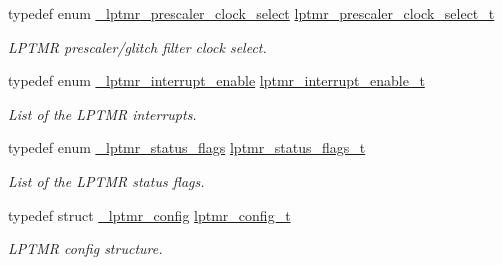 \begin{DoxyCompactItemize}
typedef enum \mbox{\hyperlink{group__lptmr_ga68d8b01f0167f938bfa86442f4772ced}{\+\_\+lptmr\+\_\+prescaler\+\_\+clock\+\_\+select}} \mbox{\hyperlink{group__lptmr_ga63bfd703c032aeb0820e8131c4720cb8}{lptmr\+\_\+prescaler\+\_\+clock\+\_\+select\+\_\+t}}
\begin{DoxyCompactList}\small\item\em L\+P\+T\+MR prescaler/glitch filter clock select. \end{DoxyCompactList}\item 
\mbox{\label{group__lptmr_gaeb8b682e5e92adfff936a174dc93a128}} 
typedef enum \mbox{\hyperlink{group__lptmr_gade9e5cb91c7534d9b9ac51909edae02e}{\+\_\+lptmr\+\_\+interrupt\+\_\+enable}} \mbox{\hyperlink{group__lptmr_gaeb8b682e5e92adfff936a174dc93a128}{lptmr\+\_\+interrupt\+\_\+enable\+\_\+t}}
\begin{DoxyCompactList}\small\item\em List of the L\+P\+T\+MR interrupts. \end{DoxyCompactList}\item 
\mbox{\label{group__lptmr_gad3b97974a37534695fe465fdb7703439}} 
typedef enum \mbox{\hyperlink{group__lptmr_ga114bc57ed4e972d512911d9d866a7573}{\+\_\+lptmr\+\_\+status\+\_\+flags}} \mbox{\hyperlink{group__lptmr_gad3b97974a37534695fe465fdb7703439}{lptmr\+\_\+status\+\_\+flags\+\_\+t}}
\begin{DoxyCompactList}\small\item\em List of the L\+P\+T\+MR status flags. \end{DoxyCompactList}\item 
typedef struct \mbox{\hyperlink{struct__lptmr__config}{\+\_\+lptmr\+\_\+config}} \mbox{\hyperlink{group__lptmr_gad0d6720b03ee0674c139c7b9bb3d0419}{lptmr\+\_\+config\+\_\+t}}
\begin{DoxyCompactList}\small\item\em L\+P\+T\+MR config structure. \end{DoxyCompactList}\end{DoxyCompactItemize}
